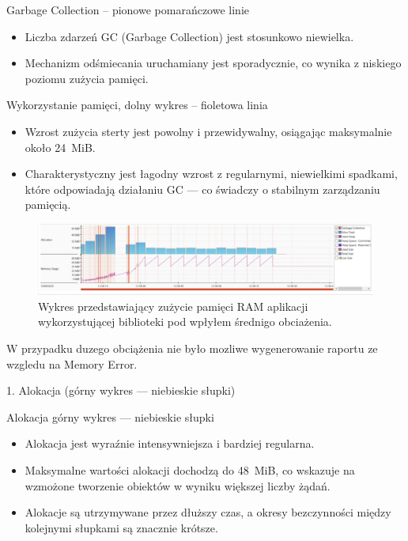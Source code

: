 \documentclass[runningheads,12pt]{llncs}
\begin{document}
Garbage Collection – pionowe pomarańczowe linie

\begin{itemize}
  \item Liczba zdarzeń GC (Garbage Collection) jest stosunkowo niewielka.
  \item Mechanizm odśmiecania uruchamiany jest sporadycznie, co wynika z niskiego poziomu zużycia pamięci.
\end{itemize}

Wykorzystanie pamięci, dolny wykres – fioletowa linia

\begin{itemize}
  \item Wzrost zużycia sterty jest powolny i przewidywalny, osiągając maksymalnie około 24~MiB.
  \item Charakterystyczny jest łagodny wzrost z regularnymi, niewielkimi spadkami, które odpowiadają działaniu GC — co świadczy o stabilnym zarządzaniu pamięcią.
\end{itemize}

\newpage

\begin{figure}
    \includegraphics[width=\linewidth]{images/library-memory-midle-graph.jpg}
    \caption{Wykres przedstawiający zużycie pamięci RAM aplikacji wykorzystującej biblioteki pod wpłyłem średnigo obciażenia.} \label{fig1}
\end{figure}

W przypadku duzego obciążenia nie było mozliwe wygenerowanie raportu ze wzgledu na Memory Error.

1. Alokacja (górny wykres — niebieskie słupki)

Alokacja górny wykres — niebieskie słupki

\begin{itemize}
  \item Alokacja jest wyraźnie intensywniejsza i bardziej regularna.
  \item Maksymalne wartości alokacji dochodzą do 48~MiB, co wskazuje na wzmożone tworzenie obiektów w wyniku większej liczby żądań.
  \item Alokacje są utrzymywane przez dłuższy czas, a okresy bezczynności między kolejnymi słupkami są znacznie krótsze.
\end{itemize}
\end{document}
